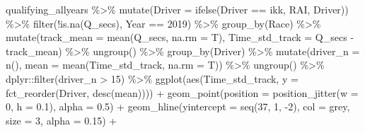 \documentclass[
]{book}
\newenvironment{Shaded}{\begin{snugshade}}{\end{snugshade}}
\newcommand{\AttributeTok}[1]{\textcolor[rgb]{0.77,0.63,0.00}{#1}}
\newcommand{\DecValTok}[1]{\textcolor[rgb]{0.00,0.00,0.81}{#1}}
\newcommand{\FloatTok}[1]{\textcolor[rgb]{0.00,0.00,0.81}{#1}}
\newcommand{\FunctionTok}[1]{\textcolor[rgb]{0.00,0.00,0.00}{#1}}
\newcommand{\NormalTok}[1]{#1}
\newcommand{\SpecialCharTok}[1]{\textcolor[rgb]{0.00,0.00,0.00}{#1}}
\newcommand{\StringTok}[1]{\textcolor[rgb]{0.31,0.60,0.02}{#1}}
\begin{document}
\begin{Shaded}
\begin{Highlighting}[]
\NormalTok{qualifying\_allyears }\SpecialCharTok{\%\textgreater{}\%}
  \FunctionTok{mutate}\NormalTok{(}\AttributeTok{Driver =} \FunctionTok{ifelse}\NormalTok{(Driver }\SpecialCharTok{==} \StringTok{\textquotesingle{}ikk\textquotesingle{}}\NormalTok{, }\StringTok{\textquotesingle{}RAI\textquotesingle{}}\NormalTok{, Driver)) }\SpecialCharTok{\%\textgreater{}\%} 
  \FunctionTok{filter}\NormalTok{(}\SpecialCharTok{!}\FunctionTok{is.na}\NormalTok{(Q\_secs),}
\NormalTok{         Year }\SpecialCharTok{==} \DecValTok{2019}\NormalTok{) }\SpecialCharTok{\%\textgreater{}\%}
  \FunctionTok{group\_by}\NormalTok{(Race) }\SpecialCharTok{\%\textgreater{}\%}
  \FunctionTok{mutate}\NormalTok{(}\AttributeTok{track\_mean =} \FunctionTok{mean}\NormalTok{(Q\_secs, }\AttributeTok{na.rm =}\NormalTok{ T),}
         \AttributeTok{Time\_std\_track =}\NormalTok{ Q\_secs }\SpecialCharTok{{-}}\NormalTok{ track\_mean) }\SpecialCharTok{\%\textgreater{}\%} 
  \FunctionTok{ungroup}\NormalTok{() }\SpecialCharTok{\%\textgreater{}\%} 
  \FunctionTok{group\_by}\NormalTok{(Driver) }\SpecialCharTok{\%\textgreater{}\%} 
  \FunctionTok{mutate}\NormalTok{(}\AttributeTok{driver\_n =} \FunctionTok{n}\NormalTok{(),}
         \AttributeTok{mean =} \FunctionTok{mean}\NormalTok{(Time\_std\_track, }\AttributeTok{na.rm =}\NormalTok{ T)) }\SpecialCharTok{\%\textgreater{}\%}
  \FunctionTok{ungroup}\NormalTok{() }\SpecialCharTok{\%\textgreater{}\%}
\NormalTok{  dplyr}\SpecialCharTok{::}\FunctionTok{filter}\NormalTok{(driver\_n }\SpecialCharTok{\textgreater{}} \DecValTok{15}\NormalTok{) }\SpecialCharTok{\%\textgreater{}\%} 
  \FunctionTok{ggplot}\NormalTok{(}\FunctionTok{aes}\NormalTok{(Time\_std\_track, }\AttributeTok{y =} \FunctionTok{fct\_reorder}\NormalTok{(Driver, }\FunctionTok{desc}\NormalTok{(mean)))) }\SpecialCharTok{+}
  \FunctionTok{geom\_point}\NormalTok{(}\AttributeTok{position =} \FunctionTok{position\_jitter}\NormalTok{(}\AttributeTok{w =} \DecValTok{0}\NormalTok{, }\AttributeTok{h =} \FloatTok{0.1}\NormalTok{), }\AttributeTok{alpha =} \FloatTok{0.5}\NormalTok{) }\SpecialCharTok{+}
  \FunctionTok{geom\_hline}\NormalTok{(}\AttributeTok{yintercept =} \FunctionTok{seq}\NormalTok{(}\DecValTok{37}\NormalTok{, }\DecValTok{1}\NormalTok{, }\SpecialCharTok{{-}}\DecValTok{2}\NormalTok{), }\AttributeTok{col =} \StringTok{\textquotesingle{}grey\textquotesingle{}}\NormalTok{, }\AttributeTok{size =} \DecValTok{3}\NormalTok{, }\AttributeTok{alpha =} \FloatTok{0.15}\NormalTok{) }\SpecialCharTok{+}

\end{Highlighting}
\end{Shaded}
\end{document}
